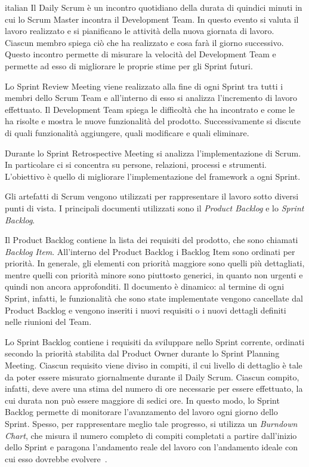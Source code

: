 \begin{otherlanguage*}{italian}
			Il Daily Scrum è un incontro quotidiano della durata di quindici minuti in cui lo Scrum Master incontra il Development Team. 
			In questo evento si valuta il lavoro realizzato e si pianificano le attività della nuova giornata di lavoro.
			Ciascun membro spiega ciò che ha realizzato e cosa farà il giorno successivo.
			Questo incontro permette di misurare la velocità del Development Team e permette ad esso di migliorare le proprie stime per gli Sprint futuri.
			
			Lo Sprint Review Meeting viene realizzato alla fine di ogni Sprint tra tutti i membri dello Scrum Team e all'interno di esso si analizza l'incremento di lavoro effettuato.
			Il Development Team spiega le difficoltà che ha incontrato e come le ha risolte e mostra le nuove funzionalità del prodotto.
			Successivamente si discute di quali funzionalità aggiungere, quali modificare e quali eliminare.

			Durante lo Sprint Retrospective Meeting si analizza l'implementazione di Scrum. 
			In particolare ci si concentra su persone, relazioni, processi e strumenti.
			L'obiettivo è quello di migliorare l'implementazione del framework a ogni Sprint.

			Gli artefatti di Scrum vengono utilizzati per rappresentare il lavoro sotto diversi punti di vista.
			I principali documenti utilizzati sono il \emph{Product Backlog} e lo \emph{Sprint Backlog}.
			
			Il Product Backlog contiene la lista dei requisiti del prodotto, che sono chiamati \emph{Backlog Item}.
			All'interno del Product Backlog i Backlog Item sono ordinati per priorità.
			In generale, gli elementi con priorità maggiore sono quelli più dettagliati, mentre quelli con priorità minore sono  piuttosto generici, in quanto non urgenti e quindi non ancora approfonditi.
			Il documento è dinamico: al termine di ogni Sprint, infatti, le funzionalità che sono state implementate vengono cancellate dal Product Backlog e vengono inseriti i nuovi requisiti o i nuovi dettagli definiti nelle riunioni del Team.

			Lo Sprint Backlog contiene i requisiti da sviluppare nello Sprint corrente, ordinati secondo la priorità stabilita dal Product Owner durante lo Sprint Planning Meeting.
			Ciascun requisito viene diviso in compiti, il cui livello di dettaglio è tale da poter essere misurato giornalmente durante il Daily Scrum.
			Ciascun compito, infatti, deve avere una stima del numero di ore necessarie per essere effettuato, la cui durata non può essere maggiore di sedici ore.
			In questo modo, lo Sprint Backlog permette di monitorare l'avanzamento del lavoro ogni giorno dello Sprint.
			Spesso, per rappresentare meglio tale progresso, si utilizza un \emph{Burndown Chart}, che misura il numero completo di compiti completati a partire dall'inizio dello Sprint e paragona l'andamento reale del lavoro con l'andamento ideale con cui esso dovrebbe evolvere~\cite{scrumEnglishGuide}.


\end{otherlanguage*}
